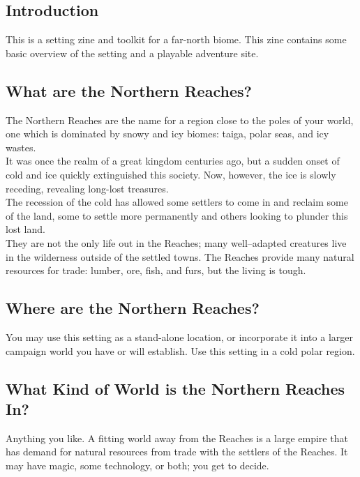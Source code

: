 \documentclass[notitlepage]{article}
\begin{document}
\begin{multicols}{2}
  
\section{Introduction}

This is a setting zine and toolkit for a far-north biome. This zine contains some basic overview of the setting and a playable adventure site.

\subsection*{What are the Northern Reaches?}

The Northern Reaches are the name for a region close to the poles of your world, one which is dominated by snowy and icy biomes: taiga, polar seas, and icy wastes. \\

It was once the realm of a great kingdom centuries ago, but a sudden onset of cold and ice quickly extinguished this society.
Now, however, the ice is slowly receding, revealing long-lost treasures. \\

The recession of the cold has allowed some settlers to come in and reclaim some of the land, some to settle more permanently and others looking to plunder this lost land. \\

They are not the only life out in the Reaches; many well--adapted creatures live in the wilderness outside of the settled towns.
The Reaches provide many natural resources for trade: lumber, ore, fish, and furs, but the living is tough.

\subsection*{Where are the Northern Reaches?}

You may use this setting as a stand-alone location, or incorporate it into a larger campaign world you have or will establish.
Use this setting in a cold polar region.

\subsection*{What Kind of World is the Northern Reaches In?}

Anything you like.
A fitting world away from the Reaches is a large empire that has demand for natural resources from trade with the settlers of the Reaches.
It may have magic, some technology, or both; you get to decide. \\


\end{multicols}
\end{document}
